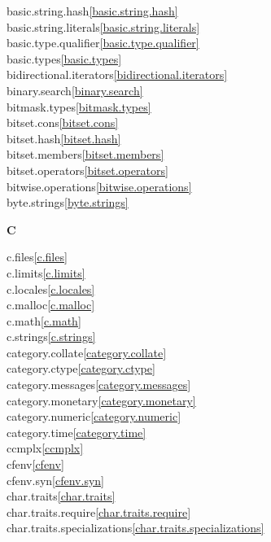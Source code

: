 \begin{multicols}{2}
basic.string.hash\quad\ref{basic.string.hash}\\
basic.string.literals\quad\ref{basic.string.literals}\\
basic.type.qualifier\quad\ref{basic.type.qualifier}\\
basic.types\quad\ref{basic.types}\\
bidirectional.iterators\quad\ref{bidirectional.iterators}\\
binary.search\quad\ref{binary.search}\\
bitmask.types\quad\ref{bitmask.types}\\
bitset.cons\quad\ref{bitset.cons}\\
bitset.hash\quad\ref{bitset.hash}\\
bitset.members\quad\ref{bitset.members}\\
bitset.operators\quad\ref{bitset.operators}\\
bitwise.operations\quad\ref{bitwise.operations}\\
byte.strings\quad\ref{byte.strings}\\
\par \textbf{C}\par
c.files\quad\ref{c.files}\\
c.limits\quad\ref{c.limits}\\
c.locales\quad\ref{c.locales}\\
c.malloc\quad\ref{c.malloc}\\
c.math\quad\ref{c.math}\\
c.strings\quad\ref{c.strings}\\
category.collate\quad\ref{category.collate}\\
category.ctype\quad\ref{category.ctype}\\
category.messages\quad\ref{category.messages}\\
category.monetary\quad\ref{category.monetary}\\
category.numeric\quad\ref{category.numeric}\\
category.time\quad\ref{category.time}\\
ccmplx\quad\ref{ccmplx}\\
cfenv\quad\ref{cfenv}\\
cfenv.syn\quad\ref{cfenv.syn}\\
char.traits\quad\ref{char.traits}\\
char.traits.require\quad\ref{char.traits.require}\\
char.traits.specializations\quad\ref{char.traits.specializations}\\

\end{multicols}

